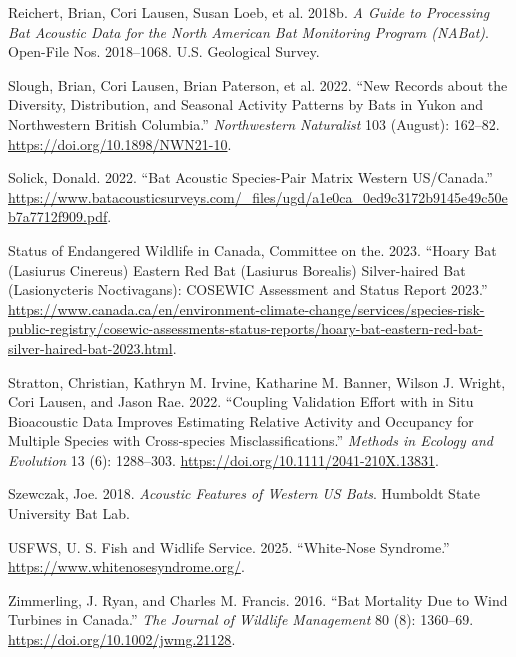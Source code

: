 \documentclass[
  letterpaper,
  DIV=11,
  numbers=noendperiod]{scrartcl}
\newlength{\cslhangindent}
\newenvironment{CSLReferences}[2] %
 {\begin{list}{}{%
  \setlength{\itemindent}{0pt}
  \setlength{\leftmargin}{0pt}
  \setlength{\parsep}{0pt}
  \ifodd #1
   \setlength{\leftmargin}{\cslhangindent}
   \setlength{\itemindent}{-1\cslhangindent}
  \fi
  \setlength{\itemsep}{#2\baselineskip}}}
 {\end{list}}
\begin{document}
\begin{CSLReferences}{1}{1}
Reichert, Brian, Cori Lausen, Susan Loeb, et al. 2018b. \emph{A {Guide}
to {Processing Bat Acoustic Data} for the {North American Bat Monitoring
Program} ({NABat})}. Open-File Nos. 2018--1068. U.S. Geological Survey.

Slough, Brian, Cori Lausen, Brian Paterson, et al. 2022. {``New Records
about the Diversity, Distribution, and Seasonal Activity Patterns by
Bats in {Yukon} and Northwestern {British Columbia}.''}
\emph{Northwestern Naturalist} 103 (August): 162--82.
\url{https://doi.org/10.1898/NWN21-10}.

Solick, Donald. 2022. {``Bat {Acoustic Species-Pair Matrix Western
US}/{Canada}.''}
\url{https://www.batacousticsurveys.com/_files/ugd/a1e0ca_0ed9c3172b9145e49c50eb7a7712f909.pdf}.

Status of Endangered Wildlife in Canada, Committee on the. 2023.
{``Hoary {Bat} ({Lasiurus} Cinereus) {Eastern Red Bat} ({Lasiurus}
Borealis) {Silver-haired Bat} ({Lasionycteris} Noctivagans): {COSEWIC}
Assessment and Status Report 2023.''}
\url{https://www.canada.ca/en/environment-climate-change/services/species-risk-public-registry/cosewic-assessments-status-reports/hoary-bat-eastern-red-bat-silver-haired-bat-2023.html}.

Stratton, Christian, Kathryn M. Irvine, Katharine M. Banner, Wilson J.
Wright, Cori Lausen, and Jason Rae. 2022. {``Coupling Validation Effort
with in Situ Bioacoustic Data Improves Estimating Relative Activity and
Occupancy for Multiple Species with Cross‐species Misclassifications.''}
\emph{Methods in Ecology and Evolution} 13 (6): 1288--303.
\url{https://doi.org/10.1111/2041-210X.13831}.

Szewczak, Joe. 2018. \emph{Acoustic {Features} of {Western US Bats}}.
Humboldt State University Bat Lab.

USFWS, U. S. Fish and Widlife Service. 2025. {``White-{Nose
Syndrome}.''} \url{https://www.whitenosesyndrome.org/}.

Zimmerling, J. Ryan, and Charles M. Francis. 2016. {``Bat Mortality Due
to Wind Turbines in {Canada}.''} \emph{The Journal of Wildlife
Management} 80 (8): 1360--69. \url{https://doi.org/10.1002/jwmg.21128}.

\end{CSLReferences}
\end{document}
